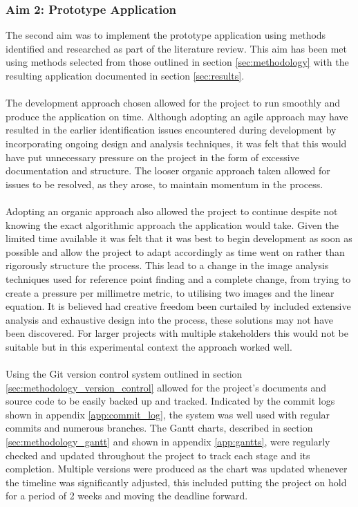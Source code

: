 		\subsubsection{Aim 2: Prototype Application}
			The second aim was to implement the prototype application using methods identified and researched as part of the literature review. This aim has been met using methods selected from those outlined in section \ref{sec:methodology} with the resulting application documented in section \ref{sec:results}.
			\\\\
			The development approach chosen allowed for the project to run smoothly and produce the application on time. Although adopting an agile approach may have resulted in the earlier identification issues encountered during development by incorporating ongoing design and analysis techniques, it was felt that this would have put unnecessary pressure on the project in the form of excessive documentation and structure. The looser organic approach taken allowed for issues to be resolved, as they arose, to maintain momentum in the process. 
			\\\\
			Adopting an organic approach also allowed the project to continue despite not knowing the exact algorithmic approach the application would take. Given the limited time available it was felt that it was best to begin development as soon as possible and allow the project to adapt accordingly as time went on rather than rigorously structure the process. This lead to a change in the image analysis techniques used for reference point finding and a complete change, from trying to create a pressure per millimetre metric, to utilising two images and the linear equation. It is believed had creative freedom been curtailed by included extensive analysis and exhaustive design into the process, these solutions may not have been discovered. For larger projects with multiple stakeholders this would not be suitable but in this experimental context the approach worked well.
			\\\\
			Using the Git version control system outlined in section \ref{sec:methodology_version_control} allowed for the project's documents and source code to be easily backed up and tracked. Indicated by the commit logs shown in appendix \ref{app:commit_log}, the system was well used with regular commits and numerous branches. The Gantt charts, described in section \ref{sec:methodology_gantt} and shown in appendix \ref{app:gantts}, were regularly checked and updated throughout the project to track each stage and its completion. Multiple versions were produced as the chart was updated whenever the timeline was significantly adjusted, this included putting the project on hold for a period of 2 weeks and moving the deadline forward.
